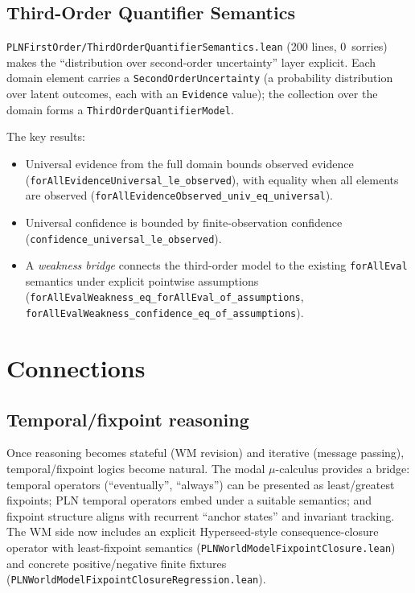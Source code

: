 \documentclass[]{article}
\newcommand{\code}[1]{\texttt{#1}}
\begin{document}
\subsection{Third-Order Quantifier Semantics}

\code{PLNFirstOrder/ThirdOrderQuantifierSemantics.lean} (200 lines,
0~sorries) makes the ``distribution over second-order uncertainty'' layer
explicit.  Each domain element carries a \code{SecondOrderUncertainty}
(a probability distribution over latent outcomes, each with an
\code{Evidence} value); the collection over the domain forms a
\code{ThirdOrderQuantifierModel}.

The key results:
\begin{itemize}[leftmargin=2em]
\item Universal evidence from the full domain bounds observed evidence
  (\code{forAllEvidenceUniversal\_le\_observed}), with equality when all
  elements are observed
  (\code{forAllEvidenceObserved\_univ\_eq\_universal}).
\item Universal confidence is bounded by finite-observation confidence
  (\code{confidence\_universal\_le\_observed}).
\item A \emph{weakness bridge} connects the third-order model to the
  existing \code{forAllEval} semantics under explicit pointwise
  assumptions
  (\code{forAllEvalWeakness\_eq\_forAllEval\_of\_assumptions},
  \code{forAllEvalWeakness\_confidence\_eq\_of\_assumptions}).
\end{itemize}


\section{Connections}
\label{sec:connections}

\subsection{Temporal/fixpoint reasoning}

Once reasoning becomes stateful (WM revision) and iterative (message
passing), temporal/fixpoint logics become natural. The modal
$\mu$-calculus provides a bridge: temporal operators (``eventually'',
``always'') can be presented as least/greatest fixpoints; PLN temporal
operators embed under a suitable semantics; and fixpoint structure aligns
with recurrent ``anchor states'' and invariant tracking.
The WM side now includes an explicit Hyperseed-style consequence-closure
operator with least-fixpoint semantics
(\code{PLNWorldModelFixpointClosure.lean}) and concrete positive/negative
finite fixtures (\code{PLNWorldModelFixpointClosureRegression.lean}).
\end{document}
